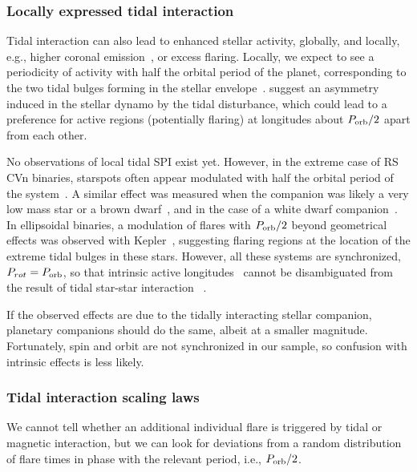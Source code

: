 \documentclass[twocolumn]{aastex631}
\begin{document}
\subsubsection{Locally expressed tidal interaction}
Tidal interaction can also lead to enhanced stellar activity, globally, and locally, e.g., higher coronal emission~\citep{ilic2022tidal}, or excess flaring. Locally, we expect to see a periodicity of activity with half the orbital period of the planet, corresponding to the two tidal bulges forming in the stellar envelope~\citep{cuntz2000stellar}. \citet{holzwarth2003dynamics} suggest an asymmetry induced in the stellar dynamo by the tidal disturbance, which could lead to a preference for active regions (potentially flaring) at longitudes about $P_{\rm orb}/2$ apart from each other. 

No observations of local tidal SPI exist yet. However, in the extreme case of RS CVn binaries, starspots often appear modulated with half the orbital period of the system~\citep{olah2002time, ozavci2018recurrent, kriskovics2023ei}. A similar effect was measured when the companion was likely a very low mass star or a brown dwarf~\citep{donati1995activity, frasca2008spots, parks2021interferometric}, and in the case of a white dwarf companion~\citep{hussain2006spot, watson2007roche}. In ellipsoidal binaries, a modulation of flares with $P_{\rm orb}/2$ beyond geometrical effects was observed with Kepler~\citep{gao2016whitelight}, suggesting flaring regions at the location of the extreme tidal bulges in these stars. However, all these systems are synchronized, $P_{rot}=P_{\rm orb}$, so that intrinsic active longitudes~\citep{usoskin2007longterm, weber2013theory, jarvinen2005spots, lanza2009corot} cannot be disambiguated from the result of tidal star-star interaction ~\citep{holzwarth2003dynamics}. 

If the observed effects are due to the tidally interacting stellar companion, planetary companions should do the same, albeit at a smaller magnitude. Fortunately, spin and orbit are not synchronized in our sample, so confusion with intrinsic effects is less likely. 

\subsubsection{Tidal interaction scaling laws}

We cannot tell whether an additional individual flare is triggered by tidal or magnetic interaction, but we can look for deviations from a random distribution of flare times in phase with the relevant period, i.e., $P_{\rm orb}/2$. 
\end{document}
